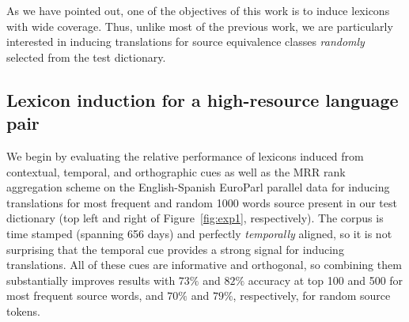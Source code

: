\documentclass{article}
\newcommand{\figref}[1]{Figure~\ref{#1}}
\begin{document}
As we have pointed out, one of the objectives of this work is to induce lexicons with wide coverage.  Thus, unlike most of the previous work, we are particularly interested in inducing translations for source equivalence classes \emph{randomly} selected from the test dictionary. 

\subsection{Lexicon induction for a high-resource language pair}

We begin by evaluating the relative performance of lexicons induced from contextual, temporal, and orthographic cues as well as the MRR rank aggregation scheme on the English-Spanish EuroParl parallel data for inducing translations for most frequent and random 1000 words source present in our test dictionary (top left and right of \figref{fig:exp1}, respectively). The corpus is time stamped (spanning 656 days) and perfectly \emph{temporally} aligned, so it is not surprising that the temporal cue provides a strong signal for inducing translations.  All of these cues are informative and orthogonal, so combining them substantially improves results with $73\%$ and  $82\%$ accuracy at top 100 and 500 for most frequent source words, and $70\%$ and  $79\%$, respectively, for random source tokens.  \\
\end{document}
